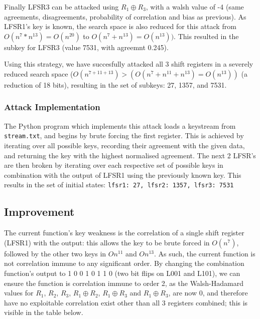 \documentclass[british,11pt,a4paper]{article}
\begin{document}
Finally LFSR3 can be attacked using \(R_1 \oplus R_3\), with a walsh value of -4 (same agreements, disagreements, probability of correlation and bias as previous).
As LFSR1's key is known, the search space is also reduced for this attack from \(O(n^{7} * n^{13})=O(n^{20})\) to \(O(n^7 + n^{13})=O(n^{13}))\). This resulted in the subkey for LFSR3 (value 7531, with agreemnt 0.245).

Using this strategy, we have succesfully attacked all 3 shift registers in a severely reduced search space (\(O(n^{7+11+13})>(O(n^{7}+n^{11}+n^{13})=O(n^{13}))\) (a reduction of 18 bits), resulting in the set of subkeys: 27, 1357, and 7531.

\subsubsection{Attack Implementation}
The Python program which implements this attack loads a keystream from \lstinline{stream.txt}, and begins by brute forcing the first register.
This is achieved by iterating over all possible keys, recording their agreement with the given data, and returning the key with the highest normalised agreement.
The next 2 LFSR's are then broken by iterating over each respective set of possible keys in combination with the output of LFSR1 using the previously known key.
This results in the set of initial states: \lstinline{lfsr1: 27, lfsr2: 1357, lfsr3: 7531}

\subsection{Improvement}
The current function's key weakness is the correlation of a single shift register (LFSR1) with the output: this allows the key to be brute forced in \(O(n^7)\), followed by the other two keys in \(On^{11}\) and \(On^{13}\).
As such, the current function is not correlation immune to any significant order.
By changing the combination function's output to 1 0 0 1 0 1 1 0 (two bit flips on L001 and L101), we can ensure the function
is correlation immune to order 2, as the Walsh-Hadamard values for \(R_1\),
\(R_2\),  \(R_3\),  \(R_1 \oplus R_2\), \(R_1 \oplus R_3\) and \(R_1 \oplus R_3\), are now 0,
and therefore have no exploitable correlation exist other than all 3 registers combined; this is visible in the table below.
\end{document}
